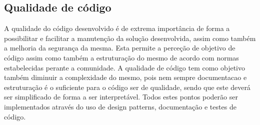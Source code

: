 \subsection{Qualidade de código}
A qualidade do código desenvolvido é de extrema importância de forma a possibilitar e facilitar a manutenção da solução desenvolvida, assim como também a melhoria da segurança da mesma. Esta permite a perceção de objetivo de código assim como também a estruturação do mesmo de acordo com normas estabelecidas perante a comunidade. A qualidade de código tem como objetivo também diminuir a complexidade do mesmo, pois nem sempre documentacao e estruturação é o suficiente para o código ser de qualidade, sendo que este deverá ser simplificado de forma a ser interpretável. Todos estes pontos poderão ser implementados através do uso de design patterns, documentação e testes de código.





